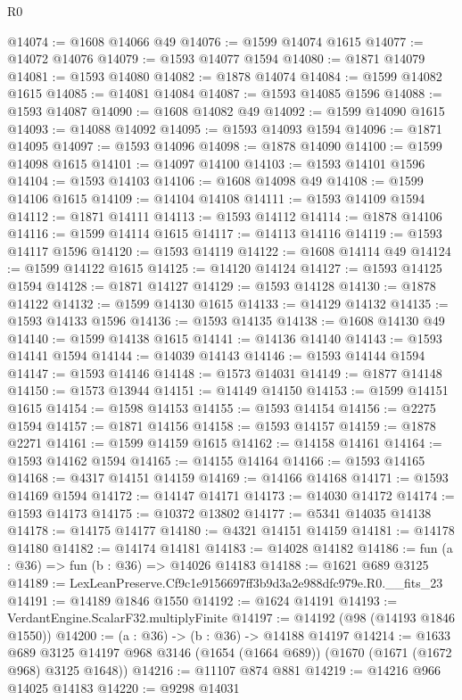 \begin{lexlean}{R0}
\begin{coremodule}
@14074 := @1608 @14066 @49
@14076 := @1599 @14074 @1615
@14077 := @14072 @14076
@14079 := @1593 @14077 @1594
@14080 := @1871 @14079
@14081 := @1593 @14080
@14082 := @1878 @14074
@14084 := @1599 @14082 @1615
@14085 := @14081 @14084
@14087 := @1593 @14085 @1596
@14088 := @1593 @14087
@14090 := @1608 @14082 @49
@14092 := @1599 @14090 @1615
@14093 := @14088 @14092
@14095 := @1593 @14093 @1594
@14096 := @1871 @14095
@14097 := @1593 @14096
@14098 := @1878 @14090
@14100 := @1599 @14098 @1615
@14101 := @14097 @14100
@14103 := @1593 @14101 @1596
@14104 := @1593 @14103
@14106 := @1608 @14098 @49
@14108 := @1599 @14106 @1615
@14109 := @14104 @14108
@14111 := @1593 @14109 @1594
@14112 := @1871 @14111
@14113 := @1593 @14112
@14114 := @1878 @14106
@14116 := @1599 @14114 @1615
@14117 := @14113 @14116
@14119 := @1593 @14117 @1596
@14120 := @1593 @14119
@14122 := @1608 @14114 @49
@14124 := @1599 @14122 @1615
@14125 := @14120 @14124
@14127 := @1593 @14125 @1594
@14128 := @1871 @14127
@14129 := @1593 @14128
@14130 := @1878 @14122
@14132 := @1599 @14130 @1615
@14133 := @14129 @14132
@14135 := @1593 @14133 @1596
@14136 := @1593 @14135
@14138 := @1608 @14130 @49
@14140 := @1599 @14138 @1615
@14141 := @14136 @14140
@14143 := @1593 @14141 @1594
@14144 := @14039 @14143
@14146 := @1593 @14144 @1594
@14147 := @1593 @14146
@14148 := @1573 @14031
@14149 := @1877 @14148
@14150 := @1573 @13944
@14151 := @14149 @14150
@14153 := @1599 @14151 @1615
@14154 := @1598 @14153
@14155 := @1593 @14154
@14156 := @2275 @1594
@14157 := @1871 @14156
@14158 := @1593 @14157
@14159 := @1878 @2271
@14161 := @1599 @14159 @1615
@14162 := @14158 @14161
@14164 := @1593 @14162 @1594
@14165 := @14155 @14164
@14166 := @1593 @14165
@14168 := @4317 @14151 @14159
@14169 := @14166 @14168
@14171 := @1593 @14169 @1594
@14172 := @14147 @14171
@14173 := @14030 @14172
@14174 := @1593 @14173
@14175 := @10372 @13802
@14177 := @5341 @14035 @14138
@14178 := @14175 @14177
@14180 := @4321 @14151 @14159
@14181 := @14178 @14180
@14182 := @14174 @14181
@14183 := @14028 @14182
@14186 := fun (a : @36) => fun (b : @36) => @14026 @14183
@14188 := @1621 @689 @3125
@14189 := LexLeanPreserve.Cf9c1e9156697ff3b9d3a2e988dfc979e.R0.__fits_23
@14191 := @14189 @1846 @1550
@14192 := @1624 @14191
@14193 := VerdantEngine.ScalarF32.multiplyFinite
@14197 := @14192 (@98 (@14193 @1846 @1550))
@14200 := (a : @36) -> (b : @36) -> @14188 @14197
@14214 := @1633
    @689
    @3125
    @14197
    @968
    @3146
    (@1654 (@1664 @689))
    (@1670 (@1671 (@1672 @968) @3125 @1648))
@14216 := @11107 @874 @881
@14219 := @14216 @966 @14025 @14183
@14220 := @9298 @14031

\end{coremodule}
\end{lexlean}
